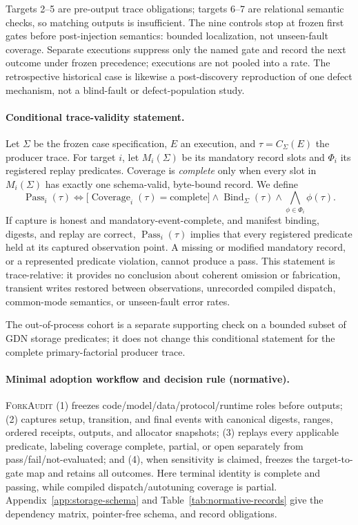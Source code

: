 \documentclass{article}
\newcommand{\method}{\textsc{ForkAudit}}
\begin{document}
Targets 2--5 are pre-output trace obligations; targets 6--7 are relational
semantic checks, so matching outputs is insufficient.  The nine controls stop
at frozen first gates before post-injection semantics: bounded localization,
not unseen-fault coverage.  Separate executions suppress only the named gate
and record the next outcome under frozen precedence; executions are not pooled
into a rate.  The retrospective historical case is likewise a post-discovery
reproduction of one defect mechanism, not a blind-fault or defect-population
study.

\paragraph{Conditional trace-validity statement.}
Let $\Sigma$ be the frozen case specification, $E$ an execution, and
$\tau=C_{\Sigma}(E)$ the producer trace.  For target $i$, let
$M_i(\Sigma)$ be its mandatory record slots and $\Phi_i$ its registered replay
predicates.  Coverage is \emph{complete} only when every slot in
$M_i(\Sigma)$ has exactly one schema-valid, byte-bound record.  We define
\begin{equation}
  \operatorname{Pass}_i(\tau) \Longleftrightarrow
  \bigl[\operatorname{Coverage}_i(\tau)=\mathrm{complete}\bigr]
  \wedge \operatorname{Bind}_{\Sigma}(\tau)
  \wedge \bigwedge_{\phi\in\Phi_i}\phi(\tau).
\end{equation}
If capture is honest and mandatory-event-complete, and manifest binding,
digests, and replay are correct, $\operatorname{Pass}_i(\tau)$ implies that
every registered predicate held at its captured observation point.  A missing
or modified mandatory record, or a represented predicate violation, cannot
produce a pass.  This statement is trace-relative: it provides no conclusion
about coherent omission or fabrication, transient writes restored between
observations, unrecorded compiled dispatch, common-mode semantics, or
unseen-fault error rates.

The out-of-process cohort is a separate supporting check on a bounded subset
of GDN storage predicates; it does not change this conditional statement for
the complete primary-factorial producer trace.

\paragraph{Minimal adoption workflow and decision rule (normative).}
\method{} (1) freezes code/model/data/protocol/runtime roles before outputs;
(2) captures setup, transition, and final events with canonical digests,
ranges, ordered receipts, outputs, and allocator snapshots; (3) replays every
applicable predicate, labeling coverage complete, partial, or open separately
from pass/fail/not-evaluated; and (4), when sensitivity is claimed, freezes the
target-to-gate map and retains all outcomes.  Here terminal identity is
complete and passing, while compiled dispatch/autotuning coverage is partial.
Appendix~\ref{app:storage-schema} and Table~\ref{tab:normative-records} give the
dependency matrix, pointer-free schema, and record obligations.
\end{document}

